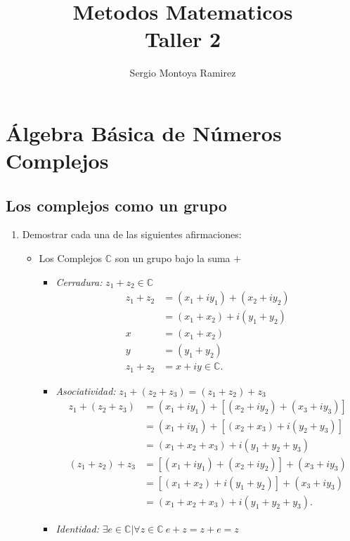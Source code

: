 \documentclass{report}
\title{\Huge{Metodos Matematicos}\\Taller 2}
\author{\huge{Sergio Montoya Ramirez}}
\date{}
\begin{document}
\maketitle
\newpage%
\tableofcontents
\pagebreak

\chapter{Álgebra Básica de Números Complejos}
\section{Los complejos como un grupo}
\begin{enumerate}
  \item Demostrar cada una de las siguientes afirmaciones:
    \begin{itemize}
    \item Los Complejos $\mathbb{C}$ son un grupo bajo la suma $+$
	\begin{itemize}
	  \item \textit{Cerradura:} $z_1+z_2\in \mathbb{C}$
	    \begin{align*} z_1 + z_2 &= \left( x_1+iy_1 \right) + \left( x_2+iy_2 \right) \\
	      &= \left( x_1+x_2 \right) +i\left( y_1+y_2 \right)  \\
	      x &= \left( x_1+x_2 \right)  \\
	      y &= \left( y_1+y_2 \right)  \\
	      z_1+z_2 &= x + iy \in \mathbb{C}
	    .\end{align*}
	  \item \textit{Asociatividad:} $z_1+\left( z_2+z_3 \right) = \left( z_1+z_2 \right) +z_3$
	    \begin{align*}
	      z_1+\left( z_2+z_3 \right) &= \left( x_1+iy_1 \right) +\left[ \left( x_2+iy_2 \right) + \left( x_3+iy_3 \right)  \right] \\
	      &= \left( x_1+iy_1 \right) + \left[ \left( x_2+x_3 \right) + i\left( y_2+y_3 \right)  \right]  \\
	      &= \left( x_1+x_2+x_3 \right) +i\left( y_1+y_2+y_3 \right)  \\
	      \left( z_1+z_2 \right) + z_3 &= \left[ \left( x_1+iy_1 \right) + \left( x_2+iy_2 \right)  \right] + \left( x_3+iy_3 \right) \\
	      &= \left[ \left( x_1+x_2 \right) +i\left( y_1+y_2 \right)  \right] + \left( x_3+iy_3 \right)  \\
	      &= \left( x_1+x_2+x_3 \right) +i\left( y_1+y_2+y_3 \right) 
	    .\end{align*}
	  \item \textit{Identidad:} $\exists e \in \mathbb{C} | \forall z \in \mathbb{C}\ e + z = z + e = z$


\end{itemize}
\end{itemize}
\end{enumerate}
\end{document}
